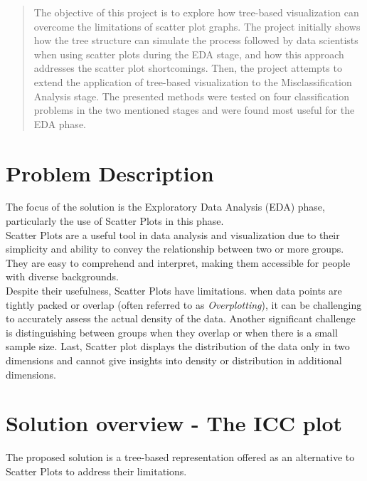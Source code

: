 \documentclass[11pt]{article}
\begin{document}
\maketitle

\begin{abstract}
The objective of this project is to explore how tree-based visualization can overcome the limitations of scatter plot graphs. The project initially shows how the tree structure can simulate the process followed by data scientists when using scatter plots during the EDA stage, and how this approach addresses the scatter plot shortcomings. Then, the project attempts to extend the application of tree-based visualization to the Misclassification Analysis stage. The presented methods were tested on four classification problems in the two mentioned stages and were found most useful for the EDA phase.


\end{abstract}

\section{Problem Description}\label{Problem Description}
The focus of the solution is the Exploratory Data Analysis (EDA) phase, particularly the use of Scatter Plots in this phase.\\
Scatter Plots are a useful tool in data analysis and visualization due to their simplicity and ability to convey the relationship between two or more groups. They are easy to comprehend and interpret, making them accessible for people with diverse backgrounds.\\
Despite their usefulness, Scatter Plots have limitations. when data points are tightly packed or overlap (often referred to as \textit{Overplotting}), it can be challenging to accurately assess the actual density of the data. Another significant challenge is distinguishing between groups when they overlap or when there is a small sample size. Last, Scatter plot displays the distribution of the data only in two dimensions and cannot give insights into density or distribution in additional dimensions.

\section{Solution overview - The ICC plot}\label{Solution overview}
The proposed solution is a tree-based representation offered as an alternative to Scatter Plots to address their limitations.
\end{document}
